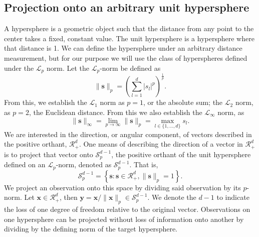\subsection{Projection onto an arbitrary unit hypersphere}
A hypersphere is a geometric object such that the distance from any point to the center takes a fixed,
  constant value.  The unit hypersphere is a hypersphere where that distance is 1. We can define the
  hypersphere under an arbitrary distance measurement, but for our purpose we will use the class of
  hyperspheres defined under the $\mathcal{L}_p$ norm. Let the $\mathcal{L}_p$-norm be defined as
  \begin{equation*}
    \lVert \bm{s} \rVert_p = \left(\sum_{l = 1}^d \lvert s_l\rvert^p\right)^{\frac{1}{p}}.
  \end{equation*}
  From this, we establish the $\mathcal{L}_1$ norm as $p = 1$, or the absolute sum; the
  $\mathcal{L}_2$ norm, as $p = 2$, the Euclidean distance.  From this we also establish the
  $\mathcal{L}_{\infty}$ norm, as
  \begin{equation*}
    \lVert \bm{s} \rVert_{\infty}
      = \lim\limits_{p\to\infty} \lVert \bm{s} \rVert_p
      = \max_{l\in\lbrace1,\ldots,d\rbrace}s_l.
  \end{equation*}
  We are interested in the direction, or angular component, of vectors described in the positive
  orthant, $\mathcal{R}_{+}^d$.  One means of describing the direction of a vector in $\mathcal{R}_+^d$
  is to project that vector onto $\mathcal{S}_{p}^{d-1}$, the positive orthant of the unit hypersphere
  defined on an $\mathcal{L}_p$-norm, denoted as $\mathcal{S}_{p}^{d-1}$.  That is,
  \begin{equation*}
    \mathcal{S}_{p}^{d-1} = \left\lbrace \bm{s} : \bm{s} \in \mathcal{R}_{+}^{d}, \lVert \bm{s}\rVert_{p} = 1\right\rbrace.
  \end{equation*}
  We project an observation onto this space by dividing said observation by its $p$-norm. Let
  $\bm{x}\in \mathcal{R}_{+}^{d}$, then $\bm{y} = \bm{x} / \lVert \bm{x}\rVert_p \in \mathcal{S}_{p}^{d-1}$.
  We denote the $d-1$ to indicate the loss of one degree of freedom relative to the original vector.
  Observations on one hypersphere can be projected without loss of information onto another by
  dividing by the defining norm of the target hypersphere.

